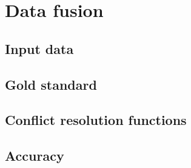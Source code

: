\section{Data fusion}
\subsection{Input data}



\subsection{Gold standard}


\subsection{Conflict resolution functions}


\subsection{Accuracy}
